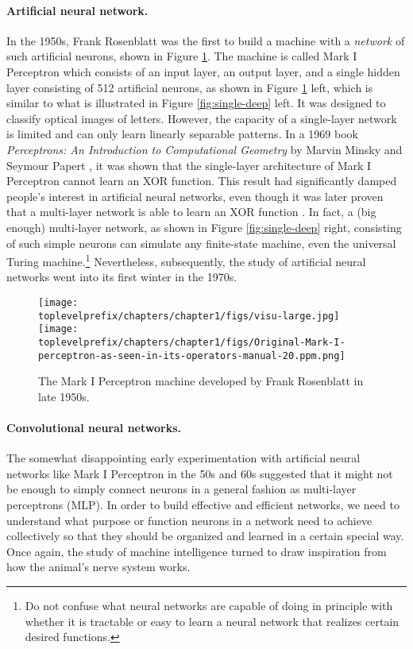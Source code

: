\documentclass[../../book-main.tex]{subfiles}
\begin{document}
\paragraph{Artificial neural network.}
In the 1950s, Frank Rosenblatt was the first to build a machine with a {\em network} of such artificial neurons, shown in Figure \ref{fig:perceptron}. The machine is called Mark I Perceptron which consists of an input layer, an output layer, and a single hidden layer consisting of 512 artificial neurons, as shown in Figure \ref{fig:perceptron} left,  which is similar to what is illustrated in Figure \ref{fig:single-deep} left. It was designed to classify optical images of letters. However, the capacity of a single-layer network is limited and can only learn linearly separable patterns. In a 1969 book {\em Perceptrons: An Introduction to Computational Geometry} by Marvin Minsky and Seymour Papert \cite{Minsky-1969}, it was shown that the single-layer architecture of Mark I Perceptron cannot learn an XOR function. This result had significantly damped people's interest in artificial neural networks, even though it was later proven that a multi-layer network is able to learn an XOR function \cite{Rumelhart1986}. In fact, a (big enough) multi-layer network, as shown in Figure \ref{fig:single-deep} right,  consisting of such simple neurons can simulate any finite-state machine, even the universal Turing machine.\footnote{Do not confuse what neural networks are  capable of doing in principle with whether it is tractable or easy to learn a neural network that realizes certain desired functions.}  Nevertheless, subsequently, the study of artificial neural networks went into its first winter in the 1970s.

\begin{figure}
    \centering
    \texttt{[image: \\toplevelprefix/chapters/chapter1/figs/visu-large.jpg]}
    \hspace{2mm} \texttt{[image: \\toplevelprefix/chapters/chapter1/figs/Original-Mark-I-perceptron-as-seen-in-its-operators-manual-20.ppm.png]}
    \caption{The Mark I Perceptron machine developed by Frank Rosenblatt in late 1950s.}
    \label{fig:perceptron}
\end{figure}


\paragraph{Convolutional neural networks.}
The somewhat disappointing early experimentation with artificial neural networks like Mark I Perceptron in the 50s and 60s suggested that it might not be enough to simply connect neurons in a general fashion as multi-layer perceptrons (MLP). In order to build effective and efficient networks, we need to understand what purpose or function neurons in a network need to achieve collectively so that they should be organized and learned in a certain special way. Once again, the study of machine intelligence turned to draw inspiration from how the animal's nerve system works. 
\end{document}
